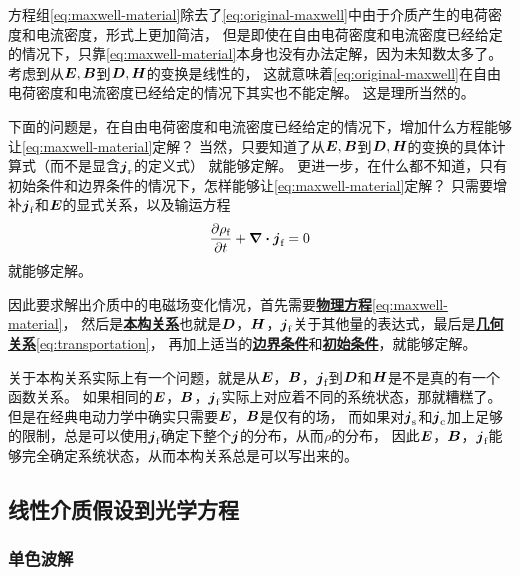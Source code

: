 \documentclass[UTF8, a4paper]{ctexart}
\newcommand*{\concept}[1]{\underline{\textbf{#1}}}
\begin{document}
方程组\eqref{eq:maxwell-material}除去了\eqref{eq:original-maxwell}中由于介质产生的电荷密度和电流密度，形式上更加简洁，
但是即使在自由电荷密度和电流密度已经给定的情况下，只靠\eqref{eq:maxwell-material}本身也没有办法定解，因为未知数太多了。
考虑到从$\vb*{E}, \vb*{B}$到$\vb*{D}, \vb*{H}$的变换是线性的，
这就意味着\eqref{eq:original-maxwell}在自由电荷密度和电流密度已经给定的情况下其实也不能定解。
这是理所当然的。

下面的问题是，在自由电荷密度和电流密度已经给定的情况下，增加什么方程能够让\eqref{eq:maxwell-material}定解？
当然，只要知道了从$\vb*{E}, \vb*{B}$到$\vb*{D}, \vb*{H}$的变换的具体计算式（而不是显含$\vb*{j}_\text{r}$的定义式）
就能够定解。
更进一步，在什么都不知道，只有初始条件和边界条件的情况下，怎样能够让\eqref{eq:maxwell-material}定解？
只需要增补$\vb*{j}_\text{f}$和$\vb*{E}$的显式关系，以及输运方程
\begin{equation}
    \pdv{\rho_\text{f}}{t} + \div{\vb*{j}_\text{f}} = 0
    \label{eq:transportation}
\end{equation}
就能够定解。

因此要求解出介质中的电磁场变化情况，首先需要\concept{物理方程}\eqref{eq:maxwell-material}，
然后是\concept{本构关系}也就是$\vb*{D}$，$\vb*{H}$，$\vb*{j}_\text{f}$关于其他量的表达式，最后是\concept{几何关系}\eqref{eq:transportation}，
再加上适当的\concept{边界条件}和\concept{初始条件}，就能够定解。

关于本构关系实际上有一个问题，就是从$\vb*{E}$，$\vb*{B}$，$\vb*{j}_\text{f}$到$\vb*{D}$和$\vb*{H}$是不是真的有一个函数关系。
如果相同的$\vb*{E}$，$\vb*{B}$，$\vb*{j}_\text{f}$实际上对应着不同的系统状态，那就糟糕了。
但是在经典电动力学中确实只需要$\vb*{E}$，$\vb*{B}$是仅有的场，
而如果对$\vb*{j}_\text{s}$和$\vb*{j}_\text{c}$加上足够的限制，总是可以使用$\vb*{j}_\text{f}$确定下整个$\vb*{j}$的分布，从而$\rho$的分布，
因此$\vb*{E}$，$\vb*{B}$，$\vb*{j}_\text{f}$能够完全确定系统状态，从而本构关系总是可以写出来的。

\subsection{线性介质假设到光学方程}

\subsubsection{单色波解}
\end{document}
